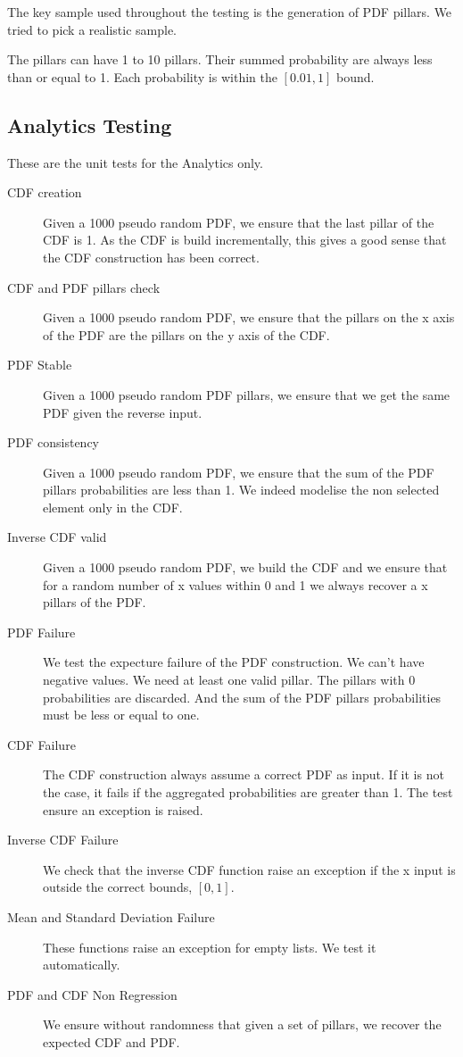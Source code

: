 \documentclass[12pt,a4paper,article]{memoir} %
\begin{document}
The key sample used throughout the testing is the generation of PDF pillars.
We tried to pick a realistic sample.

The pillars can have 1 to 10 pillars. Their summed probability are always less 
than or equal to 1.  Each probability is within the $[0.01, 1]$ bound.

\subsection{Analytics Testing} 
These are the unit tests for the Analytics only.
\begin{description}
	\item [CDF creation]
		Given a 1000 pseudo random PDF, we ensure 
		that the last pillar of the CDF is 1.
		As the CDF is build incrementally, this gives a good sense that
		the CDF construction has been correct.
	\item [CDF and PDF pillars check]
		Given a 1000 pseudo random PDF, we ensure that
		the pillars on the x axis of the PDF are the pillars on the y
		axis of the CDF.
	\item [PDF Stable]
		Given a 1000 pseudo random PDF pillars, 
		we ensure that we get the same PDF given the reverse input.
	\item [PDF consistency]
		Given a 1000 pseudo random PDF, 
		we ensure that the sum of the PDF pillars probabilities are 
		less than 1. We indeed modelise the non selected element
		only in the CDF.
	\item [Inverse CDF valid]
		Given a 1000 pseudo random PDF,
		we build the CDF and we ensure that for a random number of
		x values within 0 and 1 we always recover a x pillars of the PDF.
	\item [PDF Failure]
		We test the expecture failure of the PDF construction. 
		We can't have negative values. We need at least one valid pillar.
		The pillars with 0 probabilities are discarded.
		And the sum of the PDF pillars probabilities must be less or
		equal to one.
	\item [CDF Failure]
		 The CDF construction always assume a correct PDF as
		 input. If it is not the case, it fails if the aggregated 
		 probabilities are greater than 1.
		 The test ensure an exception is raised.
	\item [Inverse CDF Failure]
		We check that the inverse CDF function raise an
		exception if the x input is outside the correct bounds, 
		$\left[0, 1\right]$.
	\item [Mean and Standard Deviation Failure]
		These functions raise an exception for empty lists.
		We test it automatically.
	\item [PDF and CDF Non Regression]
		We ensure without randomness that given a set of pillars,
		we recover the expected CDF and PDF.
\end{description}
\end{document}
